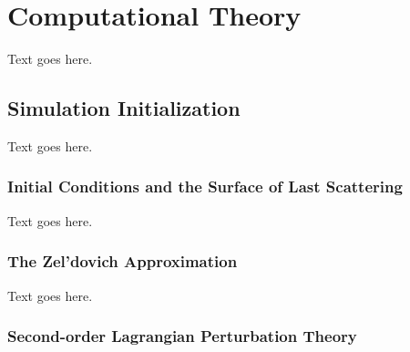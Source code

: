 
%
%

\section{Computational Theory}
\label{sec:computational_theory}



Text goes here.




\subsection{Simulation Initialization}
\label{subsec:computational_theory--simulation_initialization}


Text goes here.



\subsubsection{Initial Conditions and the Surface of Last Scattering}
\label{subsubsec:computational_theory--simulation_initialization--initial_conditions}


Text goes here.



\subsubsection{The Zel'dovich Approximation}
\label{subsubsec:computational_theory--simulation_initialization--za_theory}


Text goes here.



\subsubsection{Second-order Lagrangian Perturbation Theory}
\label{subsubsec:computational_theory--simulation_initialization--2lpt_theory}


